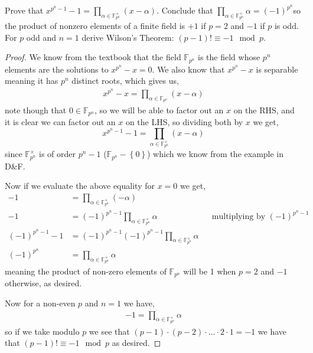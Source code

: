 \documentclass[11pt]{article}
\newenvironment{problem}[2][Problem\!]{\begin{trivlist}
\item[\hskip \labelsep {\bfseries #1}\hskip \labelsep {\bfseries #2}]}{\end{trivlist}}
\newcommand{\ff}{\mathbb F}   %
\newcommand{\set}[1]{\left\{#1\right\}} %
\begin{document}
\newpage
\vspace*{20pt}
\begin{tcolorbox}
    \begin{problem}{13.5.6}
        Prove that $x^{p^{n} - 1} -1 = \prod_{\alpha\in \mathbb{F}_{p^{n}}^{\times}}(x-\alpha)$. Conclude that $\prod_{\alpha \in \mathbb{F}_{p^{n}}^{\times}}\alpha = (-1)^{p^{n}}$so the product of nonzero elements of a finite field is $+1$ if $p= 2$ and $-1$ if $p$ is odd. For $p$ odd and $n= 1$ derive Wilson's Theorem: $(p-1)! \equiv -1 \mod{p}.$ 
    \end{problem}
\end{tcolorbox}
\begin{proof}
    We know from the textbook that the field $\ff_{p^{n}}$ is the field whose $p^{n}$ elements are the solutions to $x^{p^{n}}-x = 0$. We also know that $x^{p^{n}} - x$ is separable meaning it has $p^{n}$ distinct roots, which gives us,
    \begin{align*}
        x^{p^{n}} -x = \prod_{\alpha \in \ff_{p^{n}}}(x-\alpha) 
    \end{align*}
    note though that $0 \in \ff_{p^{n}}$, so we will be able to factor out an $x$ on the RHS, and it is clear we can factor out an $x$ on the LHS, so dividing both by $x$ we get,
    \[x^{p^{n} -1} - 1 = \prod_{\alpha\in \mathbb{F}_{p^{n}}^{\times}}(x-\alpha)\]
    since $\ff_{p^{n}}^{\times}$ is of order $p^{n} - 1$ ($\ff_{p^{n}}-  \set{0}$) which we know from the example in D\&F.

    Now if we evaluate the above equality for $x = 0$ we get,
    \begin{align*}
        -1 &= \prod_{\alpha\in \mathbb{F}_{p^{n}}^{\times}}(-\alpha) \\
        -1&= (-1)^{p^{n} - 1}\prod_{\alpha\in \mathbb{F}_{p^{n}}^{\times}}\alpha && \text{multiplying by }(-1)^{p^{n} -1 } \\
        (-1)^{p^{n} -1 } -1&=(-1)^{p^{n} -1 } (-1)^{p^{n} - 1}\prod_{\alpha\in \mathbb{F}_{p^{n}}^{\times}}\alpha \\
        (-1)^{p^{n}} &= \prod_{\alpha\in \mathbb{F}_{p^{n}}^{\times}}\alpha
    \end{align*}
    meaning the product of non-zero elements of $\ff_{p^{n}}$ will be 1 when $p =2$ and $-1$ otherwise, as desired. 

    Now for a non-even $p$ and $n = 1$ we have,
    \begin{align*}
        -1 = \prod_{\alpha\in \mathbb{F}_{p^{n}}^{\times}}\alpha
    \end{align*}
    so if we take modulo $p$ we see that $(p-1)\cdot(p-2)\cdot \dots \cdot2 \cdot 1 = -1  $ we have that $(p-1)! \equiv -1 \mod{p}$ as desired. 
\end{proof}
\end{document}
